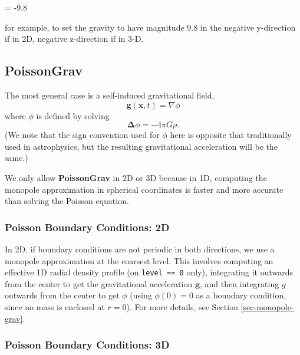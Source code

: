  = -9.8

for example, to set the gravity to have magnitude 9.8 in the 
negative y-direction if in 2D, negative z-direction if in 3-D.

\subsection{PoissonGrav}

The most general case is a self-induced gravitational field, 
\begin{equation}
\mathbf{g}(\mathbf{x},t) = \nabla \phi 
\end{equation}
where $\phi$ is defined by solving
\begin{equation}
\mathbf{\Delta} \phi = -4 \pi G \rho .\label{eq:Self Gravity}
\end{equation}
(We note that the sign convention used for $\phi$ here is opposite
that traditionally used in astrophysics, but the resulting
gravitational acceleration will be the same.)

We only allow {\bf PoissonGrav} in 2D or 3D because in 1D, computing the monopole 
approximation in spherical coordinates is faster and more accurate than solving
the Poisson equation.

\subsubsection{Poisson Boundary Conditions: 2D}

In 2D, if boundary conditions are not periodic in both directions, we use a 
monopole approximation at the coarsest level. This involves computing an effective
1D radial density profile (on \texttt{level == 0} only), integrating it outwards
from the center to get the gravitational acceleration $\mathbf{g}$, and then integrating
$g$ outwards from the center to get $\phi$ (using $\phi(0) = 0$ as a boundary condition,
since no mass is enclosed at $r = 0$). For more details, see Section \ref{sec-monopole-grav}.

\subsubsection{Poisson Boundary Conditions: 3D}\label{sec-poisson-3d-bcs}


